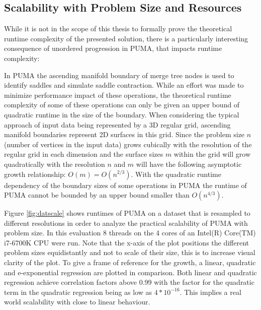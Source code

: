 \documentclass{scrartcl}
\begin{document}
\subsection{Scalability with Problem Size and Resources}
While it is not in the scope of this thesis to formally prove the theoretical runtime complexity of the presented solution, there is a particularly interesting consequence of unordered progression in PUMA, that impacts runtime complexity:

In PUMA the ascending manifold boundary of merge tree nodes is used to identify saddles and simulate saddle contraction. While an effort was made to minimize performance impact of these operations, the theoretical runtime complexity of some of these operations can only be given an upper bound of quadratic runtime in the size of the boundary. When considering the typical approach of input data being represented by a 3D regular grid, ascending manifold boundaries represent 2D surfaces in this grid. Since the problem size \(n\) (number of vertices in the input data) grows cubically with the resolution of the regular grid in each dimension and the surface sizes \(m\) within the grid will grow quadratically with the resolution \(n\) and \(m\) will have the following asymptotic growth relationship: \(O(m) =O(n^{2/3})\). With the quadratic runtime dependency of the boundary sizes of some operations in PUMA the runtime of PUMA cannot be bounded by an upper bound smaller than \(O(n^{4/3})\).

Figure \ref{fig:datscale} shows runtimes of PUMA on a dataset that is resampled to different resolutions in order to analyze the practical scalability of PUMA with problem size. In this evaluation 8 threads on the 4 cores of an Intel(R) Core(TM) i7-6700K CPU were run. Note that the x-axis of the plot positions the different problem sizes equidistantly and not to scale of their size, this is to increase visual clarity of the plot. To give a frame of reference for the growth, a linear, quadratic and e-exponential regression are plotted in comparison. Both linear and quadratic regression achieve correlation factors above 0.99 with the factor for the quadratic term in the quadratic regression being as low as \(4*10^{-16}\). This implies a real world scalability with close to linear behaviour.
\end{document}

